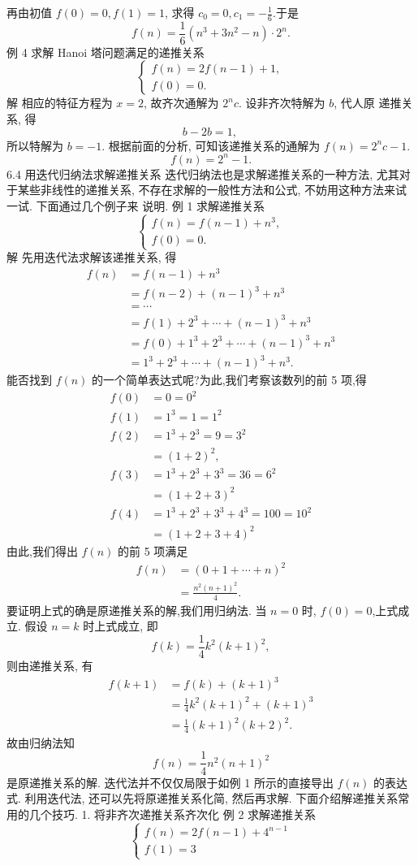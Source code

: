 \documentclass{report}
\begin{document}
再由初值 $f(0)=0, f(1)=1$, 求得 $c_0=0, c_1=-\frac{1}{6}$.于是
$$
f(n)=\frac{1}{6}\left(n^3+3 n^2-n\right) \cdot 2^n .
$$
例 4 求解 Hanoi 塔问题满足的递推关系
$$
\left\{\begin{array}{l}
	f(n)=2 f(n-1)+1, \\
	f(0)=0 .
\end{array}\right.
$$
解 相应的特征方程为 $x=2$, 故齐次通解为 $2^n c$. 设非齐次特解为 $b$, 代人原 递推关系, 得
$$
b-2 b=1 \text {, }
$$
所以特解为 $b=-1$. 根据前面的分析, 可知该递推关系的通解为
$f(n)=2^n c-1$.
$$
f(n)=2^n-1 .
$$
6.4 用迭代归纳法求解递推关系
迭代归纳法也是求解递推关系的一种方法, 尤其对于某些非线性的递推关系, 不存在求解的一般性方法和公式, 不妨用这种方法来试一试. 下面通过几个例子来 说明.
例 1 求解递推关系
$$
\left\{\begin{array}{l}
	f(n)=f(n-1)+n^3, \\
	f(0)=0 .
\end{array}\right.
$$
解 先用迭代法求解该递推关系, 得
$$
\begin{aligned}
	f(n) &=f(n-1)+n^3 \\
	&=f(n-2)+(n-1)^3+n^3 \\
	&=\cdots \\
	&=f(1)+2^3+\cdots+(n-1)^3+n^3 \\
	&=f(0)+1^3+2^3+\cdots+(n-1)^3+n^3 \\
	&=1^3+2^3+\cdots+(n-1)^3+n^3 .
\end{aligned}
$$
能否找到 $f(n)$ 的一个简单表达式呢?为此,我们考察该数列的前 5 项,得
$$
\begin{aligned}
	f(0) &=0=0^2 \\
	f(1) &=1^3=1=1^2 \\
	f(2) &=1^3+2^3=9=3^2 \\
	&=(1+2)^2, \\
	f(3) &=1^3+2^3+3^3=36=6^2 \\
	&=(1+2+3)^2 \\
	f(4) &=1^3+2^3+3^3+4^3=100=10^2 \\
	&=(1+2+3+4)^2
\end{aligned}
$$
由此,我们得出 $f(n)$ 的前 5 项满足
$$
\begin{aligned}
	f(n) &=(0+1+\cdots+n)^2 \\
	&=\frac{n^2(n+1)^2}{4} .
\end{aligned}
$$
要证明上式的确是原递推关系的解,我们用归纳法.
当 $n=0$ 时, $f(0)=0$,上式成立.
假设 $n=k$ 时上式成立, 即
$$
f(k)=\frac{1}{4} k^2(k+1)^2,
$$
则由递推关系, 有
$$
\begin{aligned}
	f(k+1) &=f(k)+(k+1)^3 \\
	&=\frac{1}{4} k^2(k+1)^2+(k+1)^3 \\
	&=\frac{1}{4}(k+1)^2(k+2)^2 .
\end{aligned}
$$
故由归纳法知
$$
f(n)=\frac{1}{4} n^2(n+1)^2
$$
是原递推关系的解.
迭代法并不仅仅局限于如例 1 所示的直接导出 $f(n)$ 的表达式. 利用迭代法, 还可以先将原递推关系化简, 然后再求解.
下面介绍解递推关系常用的几个技巧.
1. 将非齐次递推关系齐次化
例 2 求解递推关系
$$
\left\{\begin{array}{l}
	f(n)=2 f(n-1)+4^{n-1} \\
	f(1)=3
\end{array}\right.
$$
\end{document}
